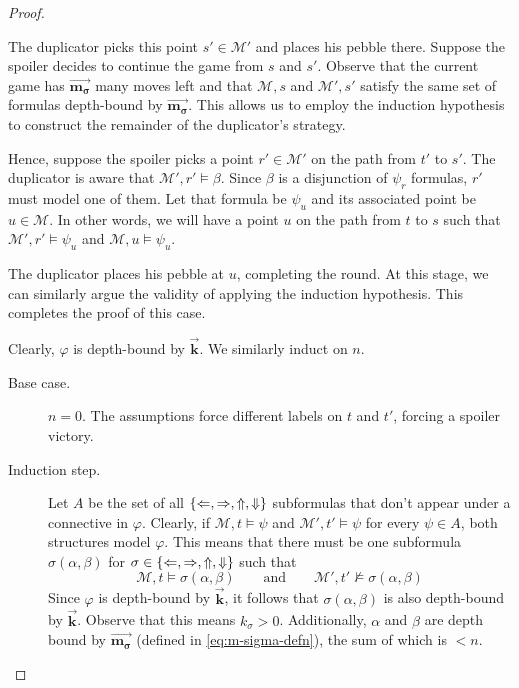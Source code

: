 \documentclass[a4paper,UKenglish,cleveref, autoref, thm-restate, numberwithinsect]{lipics-v2021}
\def\Larrow{\ensuremath\mathord{\Leftarrow}}
\def\Rarrow{\ensuremath\mathord{\Rightarrow}}
\def\Uarrow{\ensuremath\mathord{\Uparrow}}
\def\Darrow{\ensuremath\mathord{\Downarrow}}
\newcommand{\myvec}[1]{\overrightarrow{\mathbf{#1}}}
\begin{document}
\begin{proof}
\begin{description}
            The duplicator picks this point $s' \in \mathcal{M}'$ and places his pebble there. Suppose the spoiler decides to continue the game from $s$ and $s'$. Observe that the current game has $\myvec{m_\sigma}$ many moves left and that $\mathcal{M}, s$ and $\mathcal{M}', s'$ satisfy the same set of formulas depth-bound by $\myvec{m_\sigma}$. This allows us to employ the induction hypothesis to construct the remainder of the duplicator's strategy.

            Hence, suppose the spoiler picks a point $r' \in \mathcal{M}'$ on the path from $t'$ to $s'$. The duplicator is aware that $\mathcal{M}', r' \vDash \beta$. Since $\beta$ is a disjunction of $\psi_r$ formulas, $r'$ must model one of them. Let that formula be $\psi_u$ and its associated point be $u \in \mathcal{M}$. In other words, we will have a point $u$ on the path from $t$ to $s$ such that $\mathcal{M}', r' \vDash \psi_u$ and $\mathcal{M}, u \vDash \psi_u$.

            The duplicator places his pebble at $u$, completing the round. At this stage, we can similarly argue the validity of applying the induction hypothesis. This completes the proof of this case.
    \end{description}

     Clearly, $\varphi$ is depth-bound by $\myvec{k}$. We similarly induct on $n$.

    \begin{description}
        \item[Base case.] $n = 0$. The assumptions force different labels on $t$ and $t'$, forcing a spoiler victory.
        \item[Induction step.]
            Let $A$ be the set of all $\{\Larrow, \Rarrow, \Uarrow, \Darrow\}$ subformulas that don't appear under a connective in $\varphi$. Clearly, if $\mathcal{M}, t \vDash \psi$ and $\mathcal{M}', t' \vDash \psi$ for every $\psi \in A$, both structures model $\varphi$. This means that there must be one subformula $\sigma(\alpha, \beta)$ for $\sigma \in \{\Larrow, \Rarrow, \Uarrow, \Darrow\}$ such that
            \begin{equation*}
                \mathcal{M}, t \vDash \sigma(\alpha, \beta) \qquad \text{and} \qquad \mathcal{M}', t' \nvDash \sigma(\alpha, \beta)
            \end{equation*}
            Since $\varphi$ is depth-bound by $\myvec{k}$, it follows that $\sigma(\alpha, \beta)$ is also depth-bound by $\myvec{k}$. Observe that this means $k_\sigma > 0$. Additionally, $\alpha$ and $\beta$ are depth bound by $\myvec{m_\sigma}$ (defined in \cref{eq:m-sigma-defn}), the sum of which is $< n$.


\end{description}
\end{proof}
\end{document}
